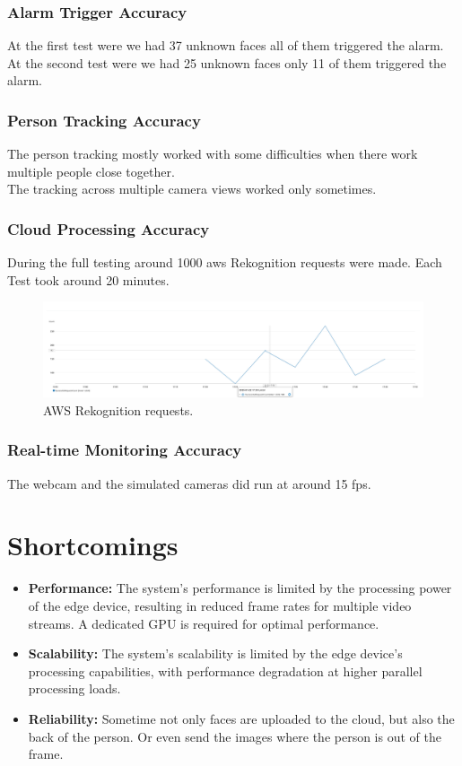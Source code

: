 \documentclass[conference]{IEEEtran}
\begin{document}
\subsubsection{Alarm Trigger Accuracy}
At the first test were we had 37 unknown faces all of them triggered the alarm.\\
At the second test were we had 25 unknown faces only 11 of them triggered the alarm.\\

\subsubsection{Person Tracking Accuracy}
The person tracking mostly worked with some difficulties when there work multiple people close together.\\
The tracking across multiple camera views worked only sometimes.

\subsubsection{Cloud Processing Accuracy}
During the full testing around 1000 aws Rekognition requests were made. Each Test took around 20 minutes.\\
\begin{figure}[ht]
      \centering
      \includegraphics[width=1\linewidth]{images/aws_rekognition.png}
      \caption{AWS Rekognition requests.}
      \label{fig:aws-rekognition}
\end{figure}

\subsubsection{Real-time Monitoring Accuracy}
The webcam and the simulated cameras did run at around 15 fps.

\section{Shortcomings}

\begin{itemize}
      \item \textbf{Performance:} The system's performance is limited by the processing power of the edge device, resulting in reduced frame rates for multiple video streams.
                                    A dedicated GPU is required for optimal performance. 
      \item \textbf{Scalability:} The system's scalability is limited by the edge device's processing capabilities, with performance degradation at higher parallel processing loads.
      \item \textbf{Reliability:} Sometime not only faces are uploaded to the cloud, but also the back of the person. Or even send the images where the person is out of the frame.
\end{itemize}
\end{document}
